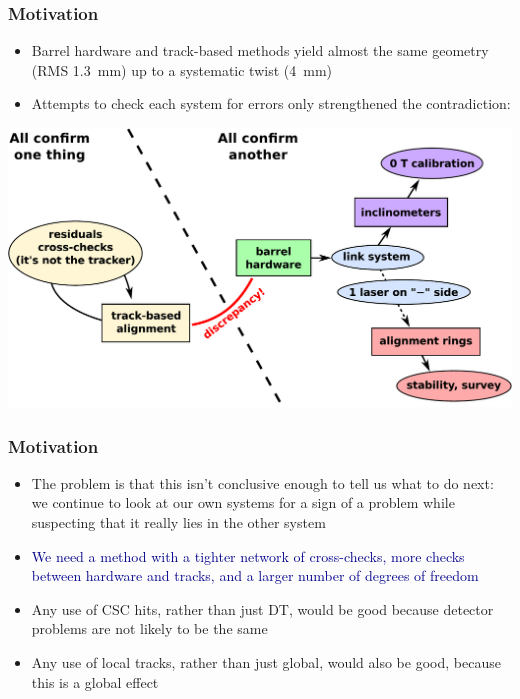 \documentclass[compress]{beamer}
\begin{document}
\begin{frame}
\frametitle{Motivation}
\begin{itemize}
\item Barrel hardware and track-based methods yield almost the same
  geometry (RMS 1.3~mm) up to a systematic twist (4~mm)
\item Attempts to check each system for errors only strengthened the contradiction:
\end{itemize}

\includegraphics[width=\linewidth]{separate.pdf}
\end{frame}

\begin{frame}
\frametitle{Motivation}
\begin{itemize}\setlength{\itemsep}{0.3 cm}
\item The problem is that this isn't conclusive enough to tell us
  what to do next: we continue to look at our own systems for a sign
  of a problem while suspecting that it really lies in the
  other system

\item \textcolor{darkblue}{We need a method with a tighter network of
  cross-checks, more checks between hardware and tracks, and a larger
  number of degrees of freedom}

\item Any use of CSC hits, rather than just DT, would be good because
  detector problems are not likely to be the same

\item Any use of local tracks, rather than just global, would also be
  good, because this is a global effect
\end{itemize}
\end{frame}
\end{document}

